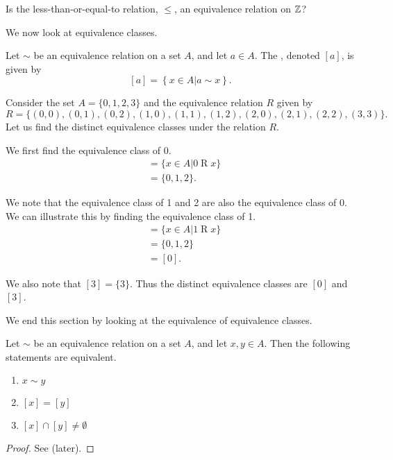\begin{exercise}
    Is the less-than-or-equal-to relation, $\leq$, an equivalence relation on $\mathbb{Z}$?
\end{exercise}

We now look at equivalence classes.
\begin{definition}
    Let $\sim$ be an equivalence relation on a set $A$, and let $a \in A$. The , denoted $[a]$, is given by
    \[
        [a] = \left\{x \in A \vert a\mathrel{\sim}x\right\}.
    \]
\end{definition}

\begin{example}
    Consider the set $A = \{0, 1, 2, 3\}$ and the equivalence relation $R$ given by
    \[
        R = \{(0, 0), (0, 1), (0, 2), (1, 0), (1, 1), (1, 2), (2, 0), (2, 1), (2, 2), (3, 3)\}.
    \]
    Let us find the distinct equivalence classes under the relation $R$.

    We first find the equivalence class of 0.
    \begin{align*}
        [0] &= \{x \in A \vert 0 \mathrel{R} x\}\\
        &= \{0, 1, 2\}.
    \end{align*}

    We note that the equivalence class of 1 and 2 are also the equivalence class of 0. We can illustrate this by finding the equivalence class of 1.
    \begin{align*}
        [1] &= \{x \in A \vert 1 \mathrel{R} x\}\\
        &= \{0, 1, 2\}\\
        &= [0].
    \end{align*}

    We also note that $[3] = \{3\}$. Thus the distinct equivalence classes are $[0]$ and $[3]$.
\end{example}

We end this section by looking at the equivalence of equivalence classes.
\begin{theorem}\label{thrm-equivalence-class-equivalence}
    Let $\sim$ be an equivalence relation on a set $A$, and let $x, y \in A$. Then the following statements are equivalent.
    \begin{enumerate}
        \item $x \mathrel{\sim} y$
        \item $[x] = [y]$
        \item $[x] \cap [y] \neq \emptyset$
    \end{enumerate}
\end{theorem}
\begin{proof}
    See  (later).
\end{proof}

